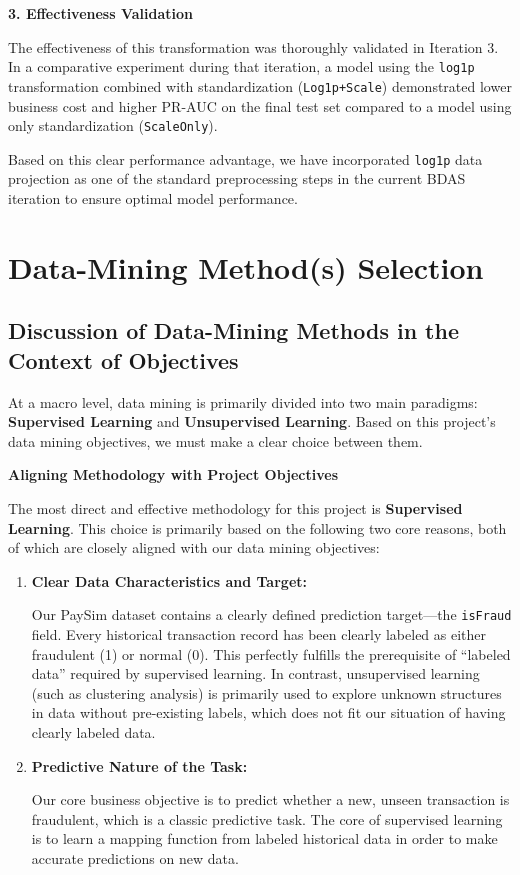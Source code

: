 \documentclass[sigplan,screen]{acmart}
\begin{document}
\textbf{3. Effectiveness Validation}

The effectiveness of this transformation was thoroughly validated in Iteration 3. In a comparative experiment during that iteration, a model using the \texttt{log1p} transformation combined with standardization (\texttt{Log1p+Scale}) demonstrated lower business cost and higher PR-AUC on the final test set compared to a model using only standardization (\texttt{ScaleOnly}).

Based on this clear performance advantage, we have incorporated \texttt{log1p} data projection as one of the standard preprocessing steps in the current BDAS iteration to ensure optimal model performance.

\section{Data-Mining Method(s) Selection}

\subsection{Discussion of Data-Mining Methods in the Context of Objectives}

At a macro level, data mining is primarily divided into two main paradigms: \textbf{Supervised Learning} and \textbf{Unsupervised Learning}. Based on this project's data mining objectives, we must make a clear choice between them.

\textbf{Aligning Methodology with Project Objectives}

The most direct and effective methodology for this project is \textbf{Supervised Learning}. This choice is primarily based on the following two core reasons, both of which are closely aligned with our data mining objectives:

\begin{enumerate}
\item \textbf{Clear Data Characteristics and Target:}

Our PaySim dataset contains a clearly defined prediction target---the \texttt{isFraud} field. Every historical transaction record has been clearly labeled as either fraudulent (1) or normal (0). This perfectly fulfills the prerequisite of ``labeled data'' required by supervised learning. In contrast, unsupervised learning (such as clustering analysis) is primarily used to explore unknown structures in data without pre-existing labels, which does not fit our situation of having clearly labeled data.

\item \textbf{Predictive Nature of the Task:}

Our core business objective is to predict whether a new, unseen transaction is fraudulent, which is a classic predictive task. The core of supervised learning is to learn a mapping function from labeled historical data in order to make accurate predictions on new data.
\end{enumerate}
\end{document}
